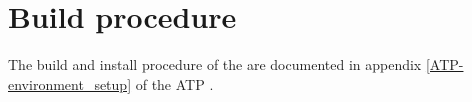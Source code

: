 \chapter{Build procedure}
\label{chap:buildProcedure}

The build and install procedure of the \applicationname{} are documented in appendix \ref{ATP-environment_setup} of the ATP \cite{atp}.
